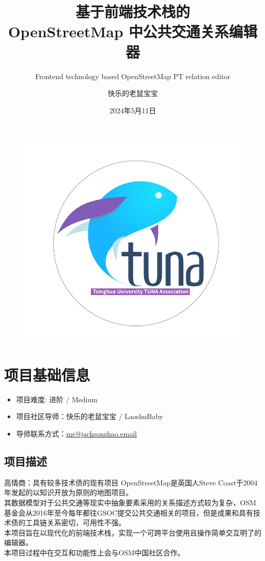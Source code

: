 \documentclass{beamer}
\author{快乐的老鼠宝宝}
\title{基于前端技术栈的\\ OpenStreetMap 中公共交通关系编辑器}
\subtitle{Frontend technology based OpenStreetMap PT relation editor}
\institute{OSMChina}
\date{2024年5月11日}
\begin{document}
\kaishu
\begin{frame}
    \titlepage
    \begin{figure}[htpb]
        \begin{center}
            \includegraphics[width=0.2\linewidth]{figure/tuna.pdf}
        \end{center}
    \end{figure}
\end{frame}

\begin{frame}
    \tableofcontents[sectionstyle=show,subsectionstyle=show/shaded/hide,subsubsectionstyle=show/shaded/hide]
\end{frame}

\section{项目基础信息}

\begin{frame}
    \begin{itemize}
        \item 项目难度: 进阶 / Medium
        \item 项目社区导师：快乐的老鼠宝宝 / LaoshuBaby
        \item 导师联系方式：\href{mailto:me@jacksonzhao.email}{me@jacksonzhao.email}
    \end{itemize}
\end{frame}

\subsection{项目描述}

\begin{frame}{高情商：具有较多技术债的现有项目}
    \quad \quad OpenStreetMap是英国人Steve Coast于2004年发起的以知识开放为原则的地图项目。\\
    \quad \quad 其数据模型对于公共交通等现实中抽象要素采用的关系描述方式较为复杂，OSM基金会从2016年至今每年都往GSOC提交公共交通相关的项目，但是成果和具有技术债的工具链关系密切，可用性不强。\\
    \quad \quad 本项目旨在以现代化的前端技术栈，实现一个可跨平台使用且操作简单交互明了的编辑器。\\
    \quad \quad 本项目过程中在交互和功能性上会与OSM中国社区合作。
\end{frame}
\end{document}
